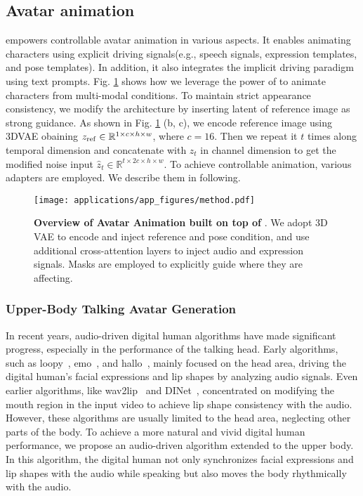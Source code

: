 \subsection{Avatar animation}

{\nameofmethod} empowers controllable avatar animation in various aspects. It enables animating characters using explicit driving signals(e.g., speech signals, expression templates, and pose templates). In addition, it also integrates the implicit driving paradigm using text prompts. Fig. \ref{fig:application-method} shows how we leverage the power of {\nameofmethod} to animate characters from multi-modal conditions. To maintain strict appearance consistency, we modify the {\nameofmethod} architecture by inserting latent of reference image as strong guidance. As shown in Fig. \ref{fig:application-method} (b, c), we encode reference image using 3DVAE obaining $z_{\rm ref} \in \mathbb{R}^{1 \times c \times h \times w}$, where $c = 16$. Then we repeat it $t$ times along temporal dimension and concatenate with $z_t$ in channel dimension to get the modified noise input $\hat{z}_t \in \mathbb{R}^{t \times 2c \times h \times w}$. To achieve controllable animation, various adapters are employed. We describe them in following.

\begin{figure}[h]
    \centering
    \texttt{[image: applications/app\_figures/method.pdf]}
    \caption{\textbf{Overview of Avatar Animation built on top of \nameofmethod}. We adopt 3D VAE to encode and inject reference and pose condition, and use additional cross-attention layers to inject audio and expression signals. Masks are employed to explicitly guide where they are affecting.}
    \label{fig:application-method}
\end{figure}

\subsubsection{Upper-Body Talking Avatar Generation}

In recent years, audio-driven digital human algorithms have made significant progress, especially in the performance of the talking head. Early algorithms, such as loopy~\cite{ye2024mimic}, emo~\cite{tian2024emo}, and hallo~\cite{xu2024hallo}, mainly focused on the head area, driving the digital human's facial expressions and lip shapes by analyzing audio signals. Even earlier algorithms, like wav2lip~\cite{prajwal2020lip} and DINet~\cite{zhang2023dinet}, concentrated on modifying the mouth region in the input video to achieve lip shape consistency with the audio. However, these algorithms are usually limited to the head area, neglecting other parts of the body. To achieve a more natural and vivid digital human performance, we propose an audio-driven algorithm extended to the upper body. In this algorithm, the digital human not only synchronizes facial expressions and lip shapes with the audio while speaking but also moves the body rhythmically with the audio.


